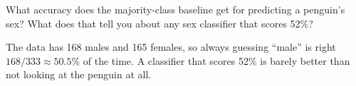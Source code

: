 \begin{Exercise}[label=cr6, title={Baseline for sex}]
What accuracy does the majority-class baseline get for predicting a penguin's sex? What does that tell you
about any sex classifier that scores 52\%?
\end{Exercise}
\begin{Answer}[ref=cr6]
The data has 168 males and 165 females, so always guessing ``male'' is right $168/333 \approx 50.5\%$ of the
time. A classifier that scores 52\% is barely better than not looking at the penguin at all.
\end{Answer}

